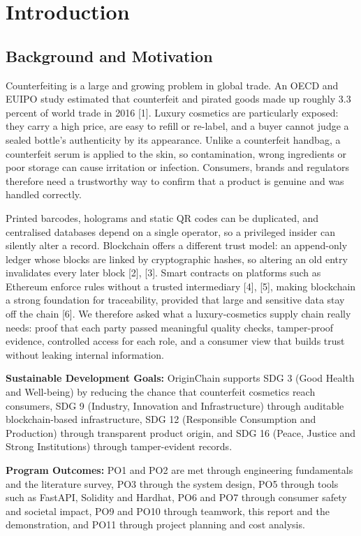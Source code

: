 \documentclass[12pt,a4paper]{report}
\begin{document}
\chapter{Introduction}

\section{Background and Motivation}
Counterfeiting is a large and growing problem in global trade. An OECD and EUIPO study estimated that counterfeit and pirated goods made up roughly 3.3 percent of world trade in 2016 [1]. Luxury cosmetics are particularly exposed: they carry a high price, are easy to refill or re-label, and a buyer cannot judge a sealed bottle's authenticity by its appearance. Unlike a counterfeit handbag, a counterfeit serum is applied to the skin, so contamination, wrong ingredients or poor storage can cause irritation or infection. Consumers, brands and regulators therefore need a trustworthy way to confirm that a product is genuine and was handled correctly.

Printed barcodes, holograms and static QR codes can be duplicated, and centralised databases depend on a single operator, so a privileged insider can silently alter a record. Blockchain offers a different trust model: an append-only ledger whose blocks are linked by cryptographic hashes, so altering an old entry invalidates every later block [2], [3]. Smart contracts on platforms such as Ethereum enforce rules without a trusted intermediary [4], [5], making blockchain a strong foundation for traceability, provided that large and sensitive data stay off the chain [6]. We therefore asked what a luxury-cosmetics supply chain really needs: proof that each party passed meaningful quality checks, tamper-proof evidence, controlled access for each role, and a consumer view that builds trust without leaking internal information.

\vspace{0.3cm}
\noindent \textbf{Sustainable Development Goals:} OriginChain supports SDG 3 (Good Health and Well-being) by reducing the chance that counterfeit cosmetics reach consumers, SDG 9 (Industry, Innovation and Infrastructure) through auditable blockchain-based infrastructure, SDG 12 (Responsible Consumption and Production) through transparent product origin, and SDG 16 (Peace, Justice and Strong Institutions) through tamper-evident records.

\vspace{0.3cm}
\noindent \textbf{Program Outcomes:} PO1 and PO2 are met through engineering fundamentals and the literature survey, PO3 through the system design, PO5 through tools such as FastAPI, Solidity and Hardhat, PO6 and PO7 through consumer safety and societal impact, PO9 and PO10 through teamwork, this report and the demonstration, and PO11 through project planning and cost analysis.
\end{document}
